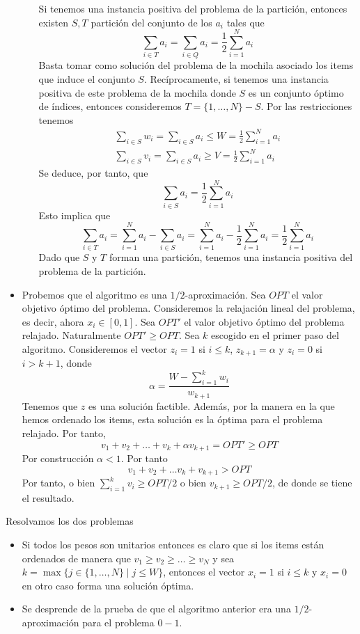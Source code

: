 \documentclass[twoside]{article}
\begin{document}
\begin{solucion}
\begin{itemize}
\begin{itemize}
Si tenemos una instancia positiva del problema de la partición, entonces existen $S,T$ partición del conjunto de los $a_i$ tales que 
$$
\sum_{i\in T} a_i = \sum_{i\in Q} a_i = \frac{1}{2}\sum_{i=1}^N a_i
$$
Basta tomar como solución del problema de la mochila asociado los items que induce el conjunto $S$. Recíprocamente, si tenemos una instancia positiva de este problema de la mochila donde $S$ es un conjunto óptimo de índices, entonces consideremos $T=\{1,\dotsc,N\}-S$. Por las restricciones tenemos
\begin{align*}
\sum_{i\in S}w_i = \sum_{i\in S}a_i \leq W = \frac{1}{2}\sum_{i=1}^N a_i\\
\sum_{i\in S}v_i = \sum_{i\in S}a_i \geq V = \frac{1}{2}\sum_{i=1}^N a_i
\end{align*}
Se deduce, por tanto, que
$$
\sum_{i\in S} a_i = \frac{1}{2}\sum_{i=1}^Na_i
$$
Esto implica que
$$
\sum_{i\in T} a_i = \sum_{i=1}^Na_i - \sum_{i\in S} a_i = \sum_{i=1}^Na_i - \frac{1}{2}\sum_{i=1}^Na_i= \frac{1}{2}\sum_{i=1}^Na_i
$$
Dado que $S$ y $T$ forman una partición, tenemos una instancia positiva del problema de la partición.
\end{itemize}
\item Probemos que el algoritmo es una $1/2$-aproximación. Sea $OPT$ el valor objetivo óptimo del problema. Consideremos la relajación lineal del problema, es decir, ahora $x_i \in [0,1]$. Sea $OPT'$ el valor objetivo óptimo del problema relajado. Naturalmente $OPT'\geq OPT$. Sea $k$ escogido en el primer paso del algoritmo. Consideremos el vector $z_i = 1$ si $i\leq k$, $z_{k+1} = \alpha$ y $z_i = 0$ si $i>k+1$, donde 
$$
\alpha = \frac{W-\sum_{i=1}^k w_i}{w_{k+1}}
$$
Tenemos que $z$ es una solución factible. Además, por la manera en la que hemos ordenado los items, esta solución es la óptima para el problema relajado. Por tanto,
$$
v_1+v_2 + \dotsc + v_k + \alpha v_{k+1} = OPT' \geq OPT
$$
Por construcción $\alpha <1$. Por tanto
$$
v_1+v_2 + \dotsc v_k + v_{k+1} > OPT
$$
Por tanto, o bien $\sum_{i=1}^k v_i \geq OPT/2$ o bien $v_{k+1}\geq OPT/2$, de donde se tiene el resultado.
\end{itemize}
\item Resolvamos los dos problemas
\begin{itemize}
\item Si todos los pesos son unitarios entonces es claro que si los items están ordenados de manera que $v_1 \geq v_2 \geq \dotsc \geq v_N$ y sea $k=\max\{j\in\{1,\dotsc,N\}\mid j \leq W\}$, entonces el vector $x_i =1$ si $i\leq k$ y $x_i = 0$ en otro caso forma una solución óptima.
\item Se desprende de la prueba de que el algoritmo anterior era una $1/2$-aproximación para el problema $0-1$. 
\end{itemize}
\end{solucion}
\newpage
\end{document}
